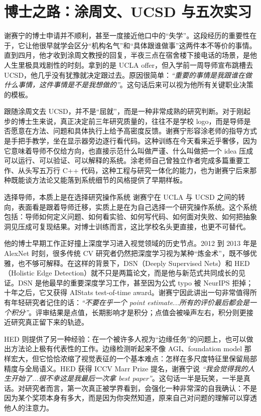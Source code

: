 \section{博士之路：涂周文、UCSD 与五次实习}

谢赛宁的博士申请并不顺利，甚至一度接近他口中的“失学”。这段经历的重要性在于，它让他很早就学会区分“机构名气”和“具体跟谁做事”这两件本不等价的事情。直到四月，他才收到涂周文教授的回复，半夜三点在宿舍楼下接电话的场景，是他人生里极具戏剧性的时刻。拿到的是 UCLA offer，但入学前一周导师宣布跳槽去 UCSD，他几乎没有犹豫就决定跟过去。原因很简单：\textit{``重要的事情是我跟谁在做什么事情，这件事情是不是我想做的''}。这句话后来可以视为他所有关键职业决策的模板。

跟随涂周文去 UCSD，并不是“屈就”，而是一种非常成熟的研究判断。对于刚起步的博士生来说，真正决定前三年研究质量的，往往不是学校 logo，而是导师是否愿意在方法、问题和具体执行上给予高密度反馈。谢赛宁形容涂老师的指导方式是手把手教学，坐在显示器旁边逐行看代码。这种训练在今天看来近乎奢侈，因为它意味着导师不仅给方向，也直接示范什么叫做严谨、什么叫做把一个 idea 压成可以运行、可以验证、可以解释的系统。涂老师自己曾独立作者完成多篇重要工作、从头写五万行 C++ 代码，这种工程与研究一体化的能力，也为谢赛宁后来那种既能谈方法论又能落到系统细节的风格提供了早期样板。

\begin{importantbox}{选择导师，本质上是在选择研究操作系统}
谢赛宁在 UCLA 与 UCSD 之间的转向，表面看是跟着导师迁移，实质上是在为自己选择一个研究操作系统。这个系统包括：导师如何定义问题、如何看实验、如何写代码、如何面对失败、如何把抽象洞见压成可复现结果。对博士训练而言，这比学校名头更直接，也更不可替代。
\end{importantbox}

他的博士早期工作正好撞上深度学习进入视觉领域的历史节点。2012 到 2013 年是 AlexNet 时刻，很多传统 CV 研究者仍然把深度学习视为某种“炼金术”，既不够优雅，也不够可解释。在这样的背景下，DSN（Deeply Supervised Nets）和 HED（Holistic Edge Detection）就不只是两篇论文，而是他与新范式共同成长的见证。DSN 是他最早的重要深度学习工作，甚至因为公式 typo 被 NeurIPS 拒掉；十年之后，它又获得 AIStats test-of-time award。谢赛宁因此讲出一句非常值得所有年轻研究者记住的话：\textit{``不要在乎一个 point estimate...所有的评价最后都会是一个积分''}。评审结果是点值，长期影响才是积分；点值会被噪声左右，积分则更接近研究真正留下来的轨迹。

HED 则提供了另一种经验：在一个被许多人视为“边缘任务”的问题上，也可以做出方法论上极有代表性的工作。边缘检测听起来不像 AGI、foundation model 那样宏大，但它恰恰浓缩了视觉表征的一个基本难点：怎样在多尺度特征里保留局部精度与全局语义。HED 获得 ICCV Marr Prize 提名，谢赛宁说 \textit{``我会觉得我的人生开始了...很不幸这是我最后一次拿 best paper''}。这句话一半是玩笑，一半是真话。对研究者而言，第一次真正被学界看到，会强化一种非常深的自我确认：不是因为某个奖项本身有多大，而是因为你突然知道，原来自己对问题的理解可以穿透他人的注意力。

